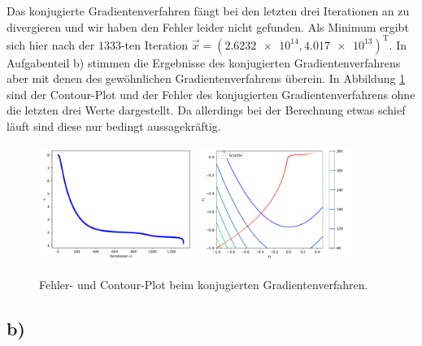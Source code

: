 Das konjugierte Gradientenverfahren fängt bei den letzten drei Iterationen an zu divergieren und wir haben den Fehler leider nicht gefunden. Als Minimum ergibt sich hier nach der \(\num{1333}\)-ten Iteration \(\vec{x} = (\num{2,6232e+14}, \num{4,017e+13})^\text{T}\).
In Aufgabenteil b) stimmen die Ergebnisse des konjugierten Gradientenverfahrens aber mit denen des gewöhnlichen Gradientenverfahrens überein.
In Abbildung \ref{fig:konj_rose} sind der Contour-Plot und der Fehler des konjugierten Gradientenverfahrens ohne die letzten drei Werte dargestellt. Da allerdings bei der Berechnung etwas schief läuft sind diese nur bedingt aussagekräftig.
\begin{figure}
  \includegraphics[width=0.45\textwidth]{A1/build/konjugiert_rosenbrock.pdf}
  \includegraphics[width=0.45\textwidth]{A1/build/konjugiert_rosenbrock_contour.pdf}
  \caption{Fehler- und Contour-Plot beim konjugierten Gradientenverfahren.}
  \label{fig:konj_rose}
\end{figure}

\FloatBarrier

\subsection*{b)}

